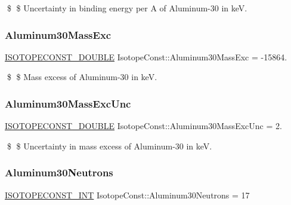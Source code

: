 \$ \$ Uncertainty in binding energy per A of Aluminum-\/30 in keV. \mbox{\label{group___isotope_const-_aluminum-_al30_ga8f3b981c7ca5751abdde9842e87b773a}} 
\subsubsection{\texorpdfstring{Aluminum30\+Mass\+Exc}{Aluminum30MassExc}}
{\footnotesize\ttfamily \mbox{\hyperlink{group___isotope_const-_macros_ga8f45a7272ce02c0b4c65c44636ed719a}{I\+S\+O\+T\+O\+P\+E\+C\+O\+N\+S\+T\+\_\+\+D\+O\+U\+B\+LE}} Isotope\+Const\+::\+Aluminum30\+Mass\+Exc = -\/15864.}

\$ \$ Mass excess of Aluminum-\/30 in keV. \mbox{\label{group___isotope_const-_aluminum-_al30_ga109295070fb30064c88223f1e4fff833}} 
\subsubsection{\texorpdfstring{Aluminum30\+Mass\+Exc\+Unc}{Aluminum30MassExcUnc}}
{\footnotesize\ttfamily \mbox{\hyperlink{group___isotope_const-_macros_ga8f45a7272ce02c0b4c65c44636ed719a}{I\+S\+O\+T\+O\+P\+E\+C\+O\+N\+S\+T\+\_\+\+D\+O\+U\+B\+LE}} Isotope\+Const\+::\+Aluminum30\+Mass\+Exc\+Unc = 2.}

\$ \$ Uncertainty in mass excess of Aluminum-\/30 in keV. \mbox{\label{group___isotope_const-_aluminum-_al30_ga75bada827a73a2d2b3d0af0113a31448}} 
\subsubsection{\texorpdfstring{Aluminum30\+Neutrons}{Aluminum30Neutrons}}
{\footnotesize\ttfamily \mbox{\hyperlink{group___isotope_const-_macros_ga5f18360b3e99483a35c32d789e62621c}{I\+S\+O\+T\+O\+P\+E\+C\+O\+N\+S\+T\+\_\+\+I\+NT}} Isotope\+Const\+::\+Aluminum30\+Neutrons = 17}

